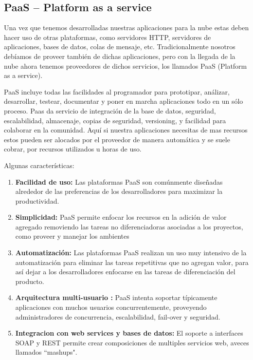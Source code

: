 \documentclass[12pt,a4paper]{article}
\begin{document}
\subsection{PaaS -- Platform as a service}
Una vez que tenemos desarrolladas nuestras aplicaciones para la nube estas deben hacer uso de otras 
plataformas, como servidores HTTP, servidores de aplicaciones, bases de datos, colas de mensaje, etc.
Tradicionalmente nosotros debíamos de proveer también de dichas aplicaciones, pero con la llegada de
la nube ahora tenemos proveedores de dichos servicios, los llamados PaaS (Platform as a service).\par
PaaS incluye todas las facilidades al programador para prototipar, análizar, desarrollar, testear, 
documentar y poner en marcha aplicaciones todo en un sólo proceso. Paas da servicio de integración de 
la base de datos, seguridad, escalabilidad, almacenaje, copias de seguridad, versioning, y facilidad 
para colaborar en la comunidad. Aquí si nuestra aplicaciones necesitas de mas recursos estos pueden 
ser alocados por el proveedor de manera automática y se suele cobrar, por recursos utilizados u horas 
de uso.\par 
Algunas características:
\begin{enumerate}

\item \textbf{Facilidad de uso: }
Las plataformas PaaS son comúnmente diseñadas alrededor de las preferencias de los desarrolladores 
para maximizar la productividad.

\item \textbf{Simplicidad: }
PaaS permite enfocar los recursos en la adición de valor agregado removiendo las tareas no 
diferenciadoras asociadas a los proyectos, como proveer y manejar los ambientes

\item \textbf{Automatización: }
Las plataformas PaaS realizan un uso muy intensivo de la automatización para eliminar las tareas 
repetitivas que no agregan valor, para así dejar a los desarrolladores enfocarse en las tareas de 
diferenciación del producto.

\item \textbf{Arquitectura multi-usuario : }
PaaS intenta soportar típicamente aplicaciones con muchos usuarios concurrentemente, proveyendo
administradores de concurrencia, escalabilidad, fail-over y seguridad.

\item \textbf{Integracion con web services y bases de datos: }
El soporte a interfaces SOAP y REST permite crear composiciones de multiples servicios web, aveces 
llamados ``mashups".

\end{enumerate}
\end{document}
